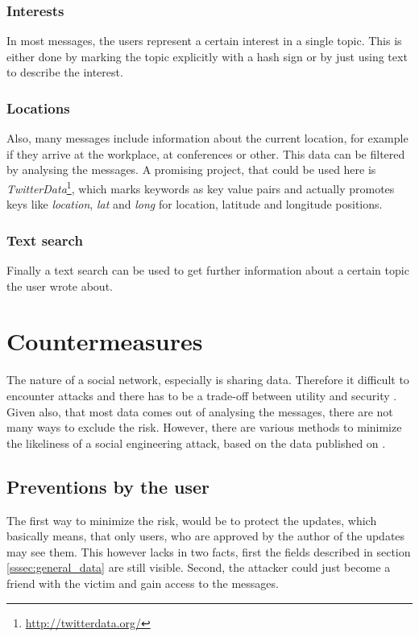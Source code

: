 \subsubsection{Interests}

In most messages, the users represent a certain interest in a single topic.
This is either done by marking the topic explicitly with a hash sign or by just
using text to describe the interest. 

\subsubsection{Locations}

Also, many messages include information about the current location, for example
if they arrive at the workplace, at conferences or other. This data can be
filtered by analysing the messages. A promising project, that could be used
here is \textit{TwitterData}\footnote{\url{http://twitterdata.org/}}, which
marks keywords as key value pairs and actually promotes keys like
\textit{location}, \textit{lat} and \textit{long} for location, latitude and longitude
positions.

\subsubsection{Text search}

Finally a text search can be used to get further information about a certain
topic the user wrote about. 

\section{Countermeasures}

The nature of a social network, especially \Twitter{} is sharing data.
Therefore it difficult to encounter attacks and there has to be a trade-off
between utility and security \cite{brown2008}. Given also, that most data comes
out of analysing the messages, there are not many ways to exclude the risk.
However, there are various methods to minimize the likeliness of a social
engineering attack, based on the data published on \Twitter{}.

\subsection{Preventions by the user}

The first way to minimize the risk, would be to protect the updates, which
basically means, that only users, who are approved by the author of the updates
may see them. This however lacks in two facts, first the fields described in
section \ref{sssec:general_data} are still visible. Second, the attacker could
just become a friend with the victim and gain access to the messages.

